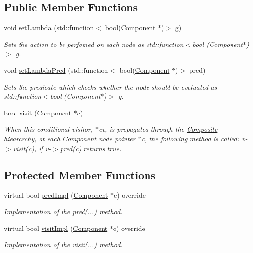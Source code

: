 \subsection*{Public Member Functions}
\begin{DoxyCompactItemize}
\item 
void \hyperlink{classVisitorLambda_a77004dd1388b4b7ebc5d1d6fe1adb747}{set\+Lambda} (std\+::function$<$ bool(\hyperlink{classComponent}{Component} $\ast$)$>$ g)
\begin{DoxyCompactList}\small\item\em Sets the action to be perfomed on each node as std\+::function$<$bool (\+Component$\ast$)$>$ g. \end{DoxyCompactList}\item 
void \hyperlink{classVisitorLambda_a46d9cc856e3fbc7155dd2212981a8902}{set\+Lambda\+Pred} (std\+::function$<$ bool(\hyperlink{classComponent}{Component} $\ast$)$>$ pred)
\begin{DoxyCompactList}\small\item\em Sets the predicate which checks whether the node should be evaluated as std\+::function$<$bool (\+Component$\ast$)$>$ g. \end{DoxyCompactList}\item 
bool \hyperlink{classVisitor_a3f8ea7ad6aa61e99d8d1bc0576bdf23c}{visit} (\hyperlink{classComponent}{Component} $\ast$c)
\begin{DoxyCompactList}\small\item\em When this conditional visitor, $\ast$cv, is propagated through the \hyperlink{classComposite}{Composite} hieararchy, at each \hyperlink{classComponent}{Component} node pointer $\ast$c, the following method is called\+: v-\/$>$visit(c), if v-\/$>$pred(c) returns true. \end{DoxyCompactList}\end{DoxyCompactItemize}
\subsection*{Protected Member Functions}
\begin{DoxyCompactItemize}
\item 
virtual bool \hyperlink{classTypeVisitorLambda_a3157fca6f97df070135388705836899a}{pred\+Impl} (\hyperlink{classComponent}{Component} $\ast$c) override
\begin{DoxyCompactList}\small\item\em Implementation of the pred(...) method. \end{DoxyCompactList}\item 
virtual bool \hyperlink{classVisitorLambda_af934df1d8669dd315d824d9ee706f250}{visit\+Impl} (\hyperlink{classComponent}{Component} $\ast$c) override
\begin{DoxyCompactList}\small\item\em Implementation of the visit(...) method. \end{DoxyCompactList}\end{DoxyCompactItemize}
